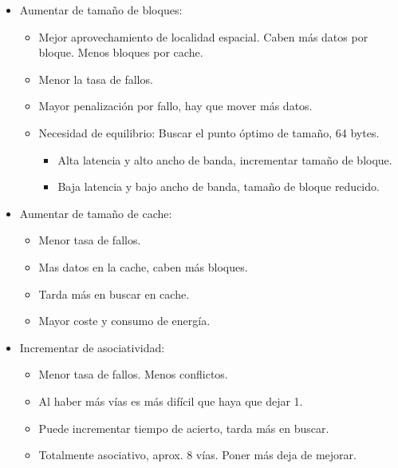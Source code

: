 \documentclass[12pt, twoside, openright]{report} %
\begin{document}
  \begin{itemize}
  
  \item
    Aumentar de tamaño de bloques:

    \begin{itemize}
    
    \item
      Mejor aprovechamiento de localidad espacial. Caben más datos por
      bloque. Menos bloques por cache.
    \item
      Menor la tasa de fallos.
    \item
      Mayor penalización por fallo, hay que mover más datos.
    \item
      Necesidad de equilibrio: Buscar el punto óptimo de tamaño, 64
      bytes.

      \begin{itemize}
      
      \item
        Alta latencia y alto ancho de banda, incrementar tamaño de
        bloque.
      \item
        Baja latencia y bajo ancho de banda, tamaño de bloque reducido.
      \end{itemize}
    \end{itemize}
  \item
    Aumentar de tamaño de cache:

    \begin{itemize}
    
    \item
      Menor tasa de fallos.
    \item
      Mas datos en la cache, caben más bloques.
    \item
      Tarda más en buscar en cache.
    \item
      Mayor coste y consumo de energía.
    \end{itemize}
  \item
    Incrementar de asociatividad:

    \begin{itemize}
    
    \item
      Menor tasa de fallos. Menos conflictos.
    \item
      Al haber más vías es más difícil que haya que dejar 1.
    \item
      Puede incrementar tiempo de acierto, tarda más en buscar.
    \item
      Totalmente asociativo, aprox. 8 vías. Poner más deja de mejorar.
    \end{itemize}
  \end{itemize}
\end{document}
